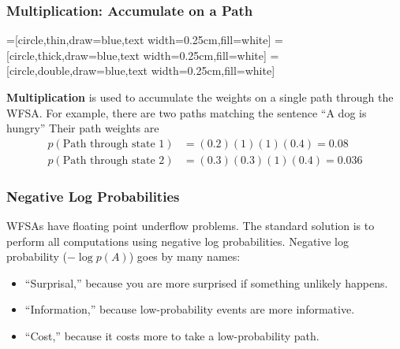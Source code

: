 \documentclass{beamer}
\begin{document}
\begin{frame}
  \frametitle{Multiplication: Accumulate on a Path}
  \begin{center}
    =[circle,thin,draw=blue,text width=0.25cm,fill=white]
    =[circle,thick,draw=blue,text width=0.25cm,fill=white]
    =[circle,double,draw=blue,text width=0.25cm,fill=white]    
  \end{center}
  
  {\bf Multiplication} is used to accumulate the weights on a single
  path through the WFSA.  For example, there are two paths matching
  the sentence ``A dog is hungry''  Their path weights are
  \begin{align*}
    p(\mbox{Path through state 1}) &= (0.2)(1)(1)(0.4) = 0.08\\
    p(\mbox{Path through state 2}) &= (0.3)(0.3)(1)(0.4) = 0.036
  \end{align*}
\end{frame}

\begin{frame}
  \frametitle{Negative Log Probabilities}

  WFSAs have floating point underflow problems.  The standard solution
  is to perform all computations using negative log probabilities.
  Negative log probability ($-\log p(A)$) goes by many names:
  \begin{itemize}
  \item ``Surprisal,'' because you are more surprised if something
    unlikely happens.
  \item ``Information,'' because low-probability events are more informative.
  \item ``Cost,'' because it costs more to take a low-probability path.
  \end{itemize}
\end{frame}
\end{document}
